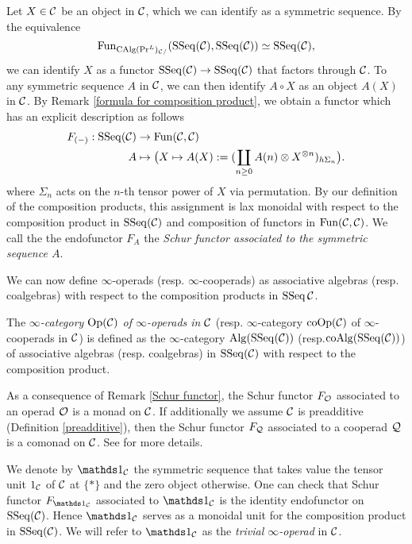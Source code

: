 \begin{remark}
\label{Schur functor}
Let $X \in {\mathcal{C}}$ be an object in ${\mathcal{C}}$, which we can identify as a symmetric sequence.
By the equivalence
$$
\operatorname{Fun}_{\operatorname{CAlg}(\Pr^L)_{{\mathcal{C}}/}}(\operatorname{SSeq}({\mathcal{C}}),\operatorname{SSeq}({\mathcal{C}}))
\simeq
\operatorname{SSeq}({\mathcal{C}}),
$$
we can identify $X$ as a functor $\operatorname{SSeq}({\mathcal{C}}) \to \operatorname{SSeq}({\mathcal{C}})$ that factors through ${\mathcal{C}}$.
To any symmetric sequence $A$ in ${\mathcal{C}}$,  we can then identify $A\circ X$ as an object $A(X)$ in ${\mathcal{C}}$.
By Remark \ref{formula for composition product}, we obtain a functor which has an explicit description as follows
\begin{align*}
		F_{(-)}: \operatorname{SSeq}({\mathcal{C}}) & \rightarrow \operatorname{Fun}({\mathcal{C}},{\mathcal{C}})\\
	A        & \mapsto \big( X\mapsto  A(X):=(\coprod_{n\geq 0} A(n)\otimes X^{\otimes n})_{h\Sigma_n}\big).
\end{align*}
where $\Sigma_n$ acts on the $n$-th tensor power of $X$ via permutation.
By our definition of the composition products, this assignment is lax monoidal with respect to the composition product in $\operatorname{SSeq}({\mathcal{C}})$ and composition of functors in $\operatorname{Fun}({\mathcal{C}},{\mathcal{C}})$.
We call the the endofunctor $F_A$ the \emph{Schur functor associated to the symmetric sequence $A$}.
\end{remark}

We can now define $\infty$-operads (resp. $\infty$-cooperads) as associative algebras (resp. coalgebras) with respect to the composition products in $\operatorname{SSeq}{{\mathcal{C}}}$.
\begin{definition}
	\label{inf operads}
	The \emph{$\infty$-category $\operatorname{Op}({\mathcal{C}})$ of $\infty$-operads in ${\mathcal{C}}$} (resp. $\infty$-category $\operatorname{coOp}({\mathcal{C}})$ of $\infty$-cooperads in ${\mathcal{C}}$) is defined as the $\infty$-category $\operatorname{Alg}(\operatorname{SSeq}({\mathcal{C}}))$ (resp.$\operatorname{coAlg}(\operatorname{SSeq}({\mathcal{C}}))$) of associative algebras (resp. coalgebras) in $\operatorname{SSeq}({\mathcal{C}})$ with respect to the composition product.
\end{definition}

\begin{remark}
\label{Schur functor and operads}
As a consequence of Remark \ref{Schur functor}, the Schur functor $F_{\mathcal{O}}$ associated to an operad ${\mathcal{O}}$ is a monad on ${\mathcal{C}}$.
If additionally we assume ${\mathcal{C}}$ is preadditive (Definition \ref{preadditive}),
then the Schur functor $F_{\mathcal{Q}}$ associated to a cooperad ${\mathcal{Q}}$ is a comonad on ${\mathcal{C}}$. See \cite[Remark 2.21]{ChingBar} for more details.
\end{remark}

\begin{example}
    	We denote by $\triv_{\CC}$ the symmetric sequence that takes value the tensor unit $1_{\mathcal{C}}$ of ${\mathcal{C}}$ at $\{*\}$ and the zero object otherwise. One can check that Schur functor $F_{\triv_{\CC}}$ associated to $\triv_{\CC}$ is the identity endofunctor on $\operatorname{SSeq}({\mathcal{C}})$. Hence $\triv_{\CC}$ serves as a monoidal unit for the composition product in $\operatorname{SSeq}({\mathcal{C}})$.
	We will refer to $\triv_{\CC}$ as the \emph{trivial $\infty$-operad} in ${\mathcal{C}}$.
\end{example}


